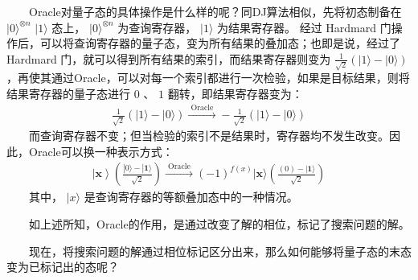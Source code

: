 \documentclass[a4paper,11pt,english]{sphinxmanual}
\begin{document}
\sphinxAtStartPar
  Oracle对量子态的具体操作是什么样的呢？同D\sphinxhyphen{}J算法相似，先将初态制备在 \(|0\rangle^{\otimes n}\)  \(|1\rangle\) 态上， \(|0\rangle^{\otimes n}\) 为查询寄存器， \(|1\rangle\) 为结果寄存器。 经过 Hardmard 门操作后，可以将查询寄存器的量子态，变为所有结果的叠加态；也即是说，经过了 Hardmard 门，就可以得到所有结果的索引，而结果寄存器则变为 \(\frac{1}{\sqrt{2}}(|1\rangle-|0\rangle)\) ，再使其通过Oracle，可以对每一个索引都进行一次检验，如果是目标结果，则将结果寄存器的量子态进行  \({0}\) 、 \({1}\) 翻转，即结果寄存器变为：
\begin{equation*}
\begin{split}\frac{1}{\sqrt{2}}(|1\rangle-|0\rangle)\stackrel{\text { Oracle }}{\longrightarrow}-\frac{1}{\sqrt{2}}(|1\rangle-|0\rangle)\end{split}
\end{equation*}
\sphinxAtStartPar
  而查询寄存器不变；但当检验的索引不是结果时，寄存器均不发生改变。因此，Oracle可以换一种表示方式：
\begin{equation*}
\begin{split}\left.\left.\right|\mathbf{x}\right\rangle\left(\frac{|0\rangle-|\mathbf{1}\rangle}{\sqrt{2}}\right) \stackrel{\text { Oracle }}{\longrightarrow}(-1)^{f(x)} |\mathbf{x}\rangle\left(\frac{(0)-|\mathbf{1}\rangle}{\sqrt{2}}\right)\end{split}
\end{equation*}
\sphinxAtStartPar
  其中， \(|x\rangle\) 是查询寄存器的等额叠加态中的一种情况。

\sphinxAtStartPar
  如上述所知，Oracle的作用，是通过改变了解的相位，标记了搜索问题的解。

\sphinxAtStartPar
  现在，将搜索问题的解通过相位标记区分出来，那么如何能够将量子态的末态变为已标记出的态呢？
\end{document}
